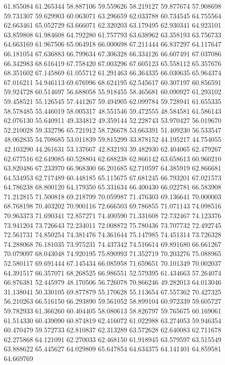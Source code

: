 61.855084
61.265344
58.887106
59.559626
58.219127
59.877674
57.908698
59.731307
59.629903
60.063071
63.296659
62.033788
60.734545
64.755564
62.663461
65.052729
63.666071
62.320203
63.179495
62.930341
64.923101
63.859808
61.984608
64.792280
61.757793
63.638962
63.358193
63.756733
64.663169
61.967506
65.064918
66.000698
67.211444
66.837297
64.117647
66.181054
67.636883
66.799634
67.306328
66.334126
66.607491
67.037086
66.342983
68.616419
67.758420
67.003296
67.605123
65.558112
65.357676
68.351602
67.145869
61.055712
61.291463
66.364335
66.030635
65.964374
67.016211
54.946113
69.676996
68.624195
62.545617
60.307197
60.856591
59.924728
60.514697
56.688058
55.918455
58.465681
60.090927
61.293102
59.458521
55.126545
57.441267
59.494905
62.099784
59.728941
61.655335
58.578485
55.446019
58.005317
48.551546
59.472555
48.584581
61.586143
62.076130
55.640911
49.334812
49.359144
52.228743
53.970427
56.019670
52.210028
59.332796
65.721912
58.726678
53.663391
51.409230
56.533547
48.062835
54.708685
53.011839
59.815299
33.878152
44.195217
44.754055
42.103290
44.261631
53.137667
42.832193
39.482930
62.404065
62.479267
62.677516
62.649085
60.528804
62.688238
62.866142
63.658613
60.960210
63.820486
67.233970
66.968300
66.201685
62.710597
64.385919
62.866681
64.534953
62.717489
60.448185
65.115675
67.681245
66.793201
67.021573
64.786238
68.800120
64.179350
65.331634
66.400430
66.022781
66.583908
71.212815
71.500818
69.218799
70.059987
71.476303
69.136641
70.000003
68.768198
70.403202
70.900116
72.666503
69.786855
71.071143
74.098516
70.963373
71.690341
72.857271
74.400590
71.331608
72.732467
74.123376
73.941204
73.726643
72.234011
72.008872
75.780436
73.707732
72.492745
72.561731
74.850254
74.381476
74.361644
75.147985
74.451314
73.726328
74.288068
76.181035
73.975231
74.437342
74.516614
69.891680
66.661267
70.079097
68.043048
74.920195
75.890993
71.352719
70.203276
75.088965
52.580117
69.691444
67.145434
66.085958
71.659651
70.101349
70.002037
64.391517
66.357071
68.268525
66.986551
52.579395
61.434663
57.264074
66.876381
52.445979
48.170506
56.726078
70.866246
49.282013
64.013046
31.138041
50.330105
69.877879
55.170628
55.113654
67.557362
70.427325
56.210263
66.516150
66.293890
59.561052
58.899104
60.972339
59.605727
59.782933
61.366260
60.404405
58.080613
58.826797
59.765675
60.169061
61.514330
60.439090
60.874819
62.416072
61.022988
63.274053
59.946354
60.470479
59.572733
62.810837
62.313289
63.572628
62.640083
62.711678
62.275868
64.121091
62.270033
62.468150
61.918945
63.579597
63.515549
63.888622
65.445627
64.029809
65.647854
64.634375
64.141401
64.859581
64.669769
